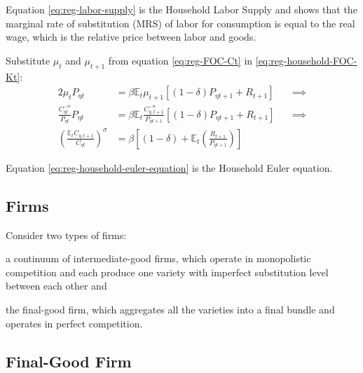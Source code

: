\documentclass[
	thesis.tex
	]{subfiles}
\begin{document}
Equation \ref{eq:reg-labor-supply} is the Household Labor Supply and shows that the marginal rate of substitution (MRS) of labor for consumption is equal to the real wage, which is the relative price between labor and goods.

Substitute $\mu_t$ and $\mu_{t+1}$ from equation \ref{eq:reg-FOC-Ct} in \ref{eq:reg-household-FOC-Kt}:
\begin{alignat}{2}
	\mu_t P_{\eta t} & = \beta \mathbb{E}_t \mu_{t+1} [(1-\delta) P_{\eta t+1} + R_{t+1}] \quad &\implies \nonumber \\
	\frac{C_{\eta t}^{-\sigma}}{P_{\eta t}} P_{\eta t} & = \beta \mathbb{E}_t \frac{C_{\eta, t+1}^{-\sigma}}{P_{\eta t+1}} [(1-\delta) P_{\eta t+1} + R_{t+1}] &\implies \nonumber \\
	\left( \frac{\mathbb{E}_t C_{\eta, t+1}}{C_{\eta t}} \right)^\sigma & = \beta \left[ (1-\delta) + \mathbb{E}_t \left(\frac{R_{t+1}}{P_{\eta t+1}}\right) \right] \label{eq:reg-household-euler-equation}
\end{alignat}

Equation \ref{eq:reg-household-euler-equation} is the Household Euler equation.


\subsection*{Firms}

Consider two types of firms: 
\begin{enumerate*}[label=(\arabic*)]
	\item a continuum of intermediate-good firms, which operate in monopolistic competition and each produce one variety with imperfect substitution level between each other and
	
	\item the final-good firm, which aggregates all the varieties into a final bundle and operates in perfect competition.
\end{enumerate*}


\subsection{Final-Good Firm}
\end{document}
